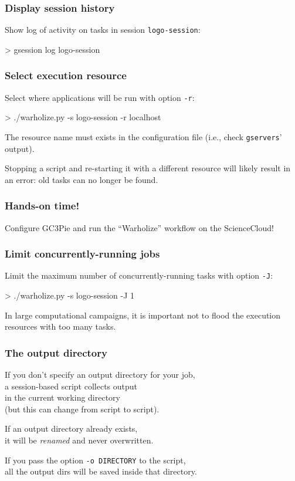 \documentclass[english,serif,mathserif,usenames,dvipsnames]{beamer}
\begin{document}
\begin{frame}
  \frametitle{Display session history}

  Show log of activity on tasks in session \texttt{logo-session}:
\begin{semiverbatim}
    > gsession log logo-session
\end{semiverbatim}
\end{frame}


\begin{frame}
  \frametitle{Select execution resource}

  Select where applications will be run with option \texttt{-r}:
\begin{semiverbatim}
    > ./warholize.py -s logo-session -r localhost
\end{semiverbatim}

  \+ The resource name must exists in the configuration file (i.e.,
  check \texttt{gservers}' output).

  \+ Stopping a script and re-starting it with a different resource
  will likely result in an error: old tasks can no longer be found.
\end{frame}


\begin{frame}
  \frametitle{Hands-on time!}
  \begin{exercise*}
    Configure GC3Pie and run the ``Warholize'' workflow on the
    ScienceCloud!
  \end{exercise*}
\end{frame}


\begin{frame}
  \frametitle{Limit concurrently-running jobs}

  Limit the maximum number of concurrently-running tasks
  with option \texttt{-J}:
\begin{semiverbatim}
    > ./warholize.py -s logo-session -J 1
\end{semiverbatim}

  \+ In large computational campaigns, it is important not to flood the
  execution resources with too many tasks.
\end{frame}


\begin{frame}
  \frametitle{The output directory}
  \begin{center}
    If you don't specify an output directory for your job, \\ a
    session-based script collects output \\ in the current working
    directory \\ (but this can change from script to script).

    \+ If an output directory already exists, \\ it will be
    \textit{renamed} and never overwritten.

    \+ If you pass the option \lstinline|-o DIRECTORY| to the script, \\
    all the output dirs will be saved inside that directory.
  \end{center}
\end{frame}
\end{document}
